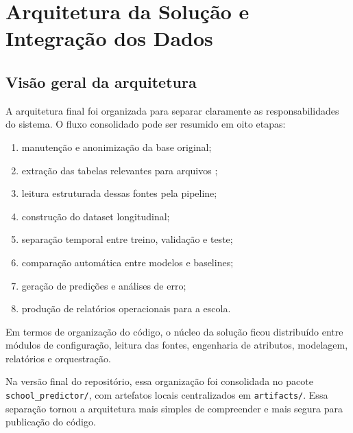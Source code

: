 \chapter{Arquitetura da Solu\c{c}\~ao e Integra\c{c}\~ao dos Dados}
\label{cap:arquitetura}

\section{Vis\~ao geral da arquitetura}
\label{sec:visao-geral}

A arquitetura final foi organizada para separar claramente as responsabilidades do sistema. O fluxo consolidado pode ser resumido em oito etapas:

\begin{enumerate}
    \item manuten\c{c}\~ao e anonimiza\c{c}\~ao da base original;
    \item extra\c{c}\~ao das tabelas relevantes para arquivos ;
    \item leitura estruturada dessas fontes pela pipeline;
    \item constru\c{c}\~ao do dataset longitudinal;
    \item separa\c{c}\~ao temporal entre treino, valida\c{c}\~ao e teste;
    \item compara\c{c}\~ao autom\'atica entre modelos e baselines;
    \item gera\c{c}\~ao de predi\c{c}\~oes e an\'alises de erro;
    \item produ\c{c}\~ao de relat\'orios operacionais para a escola.
\end{enumerate}

Em termos de organiza\c{c}\~ao do c\'odigo, o n\'ucleo da solu\c{c}\~ao ficou distribu\'ido entre m\'odulos de configura\c{c}\~ao, leitura das fontes, engenharia de atributos, modelagem, relat\'orios e orquestra\c{c}\~ao.

Na vers\~ao final do reposit\'orio, essa organiza\c{c}\~ao foi consolidada no pacote \texttt{school\_predictor/}, com artefatos locais centralizados em \texttt{artifacts/}. Essa separa\c{c}\~ao tornou a arquitetura mais simples de compreender e mais segura para publica\c{c}\~ao do c\'odigo.

